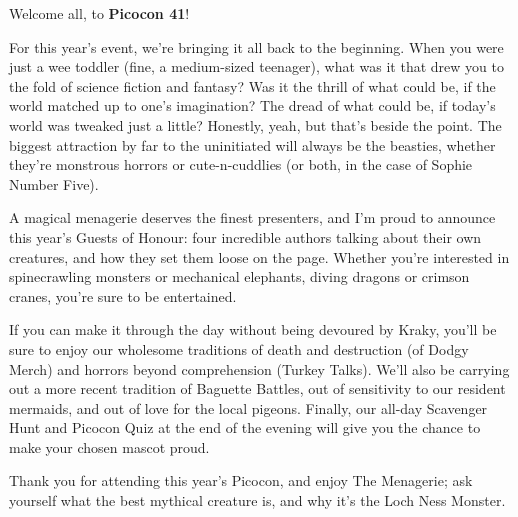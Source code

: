 Welcome all, to \textbf{Picocon 41}!

For this year’s event, we’re bringing it all back to the beginning. When you were just a wee toddler (fine, a medium-sized teenager), what was it that drew you to the fold of science fiction and fantasy? Was it the thrill of what could be, if the world matched up to one’s imagination? The dread of what could be, if today’s world was tweaked just a little? Honestly, yeah, but that’s beside the point. The biggest attraction by far to the uninitiated will always be the beasties, whether they’re monstrous horrors or cute-n-cuddlies (or both, in the case of Sophie Number Five).

A magical menagerie deserves the finest presenters, and I’m proud to announce this year’s Guests of Honour: four incredible authors talking about their own creatures, and how they set them loose on the page. Whether you’re interested in spinecrawling monsters or mechanical elephants, diving dragons or crimson cranes, you’re sure to be entertained.

If you can make it through the day without being devoured by Kraky, you’ll be sure to enjoy our wholesome traditions of death and destruction (of Dodgy Merch) and horrors beyond comprehension (Turkey Talks). We’ll also be carrying out a more recent tradition of Baguette Battles, out of sensitivity to our resident mermaids, and out of love for the local pigeons. Finally, our all-day Scavenger Hunt and Picocon Quiz at the end of the evening will give you the chance to make your chosen mascot proud.

Thank you for attending this year’s Picocon, and enjoy The Menagerie; ask yourself what the best mythical creature is, and why it’s the Loch Ness Monster.